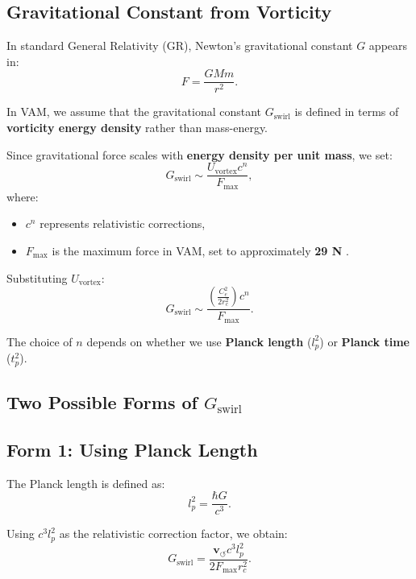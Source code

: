     \subsection*{Gravitational Constant from Vorticity}
    In standard General Relativity (GR), Newton's gravitational constant \( G \) appears in:
    \begin{equation*}
        F = \frac{GMm}{r^2}.
    \end{equation*}

    In VAM, we assume that the gravitational constant \(  G_\text{swirl} \) is defined in terms of \textbf{vorticity energy density} rather than mass-energy.

    Since gravitational force scales with \textbf{energy density per unit mass}, we set:
    \begin{equation*}
        G_\text{swirl} \sim \frac{U_\text{vortex} c^n}{F_{\max}},
    \end{equation*}
    where:
    \begin{itemize}
        \item \( c^n \) represents relativistic corrections,
        \item \( F_{\max} \) is the maximum force in VAM, set to approximately \textbf{29 N} \cite{schiller_max_force}.
    \end{itemize}

    Substituting \( U_\text{vortex} \):
    \begin{equation*}
        G_\text{swirl} \sim \frac{\left( \frac{C_e^2}{2 r_c^2} \right) c^n}{F_{\max}}.
    \end{equation*}

    The choice of \( n \) depends on whether we use \textbf{Planck length} (\( l_p^2 \)) or \textbf{Planck time} (\( t_p^2 \)).

    \subsection*{Two Possible Forms of \(  G_\text{swirl} \)}
    \subsection*{Form 1: Using Planck Length}
    The Planck length is defined as:
    \begin{equation*}
        l_p^2 = \frac{\hbar G}{c^3}.
    \end{equation*}

    Using \( c^3 l_p^2 \) as the relativistic correction factor, we obtain:
    \begin{equation*}
        G_\text{swirl} = \frac{\mathbf{v}_{\scriptscriptstyle\boldsymbol{\circlearrowleft}} c^3 l_p^2}{2 F_{\max} r_c^2}.
    \end{equation*}

